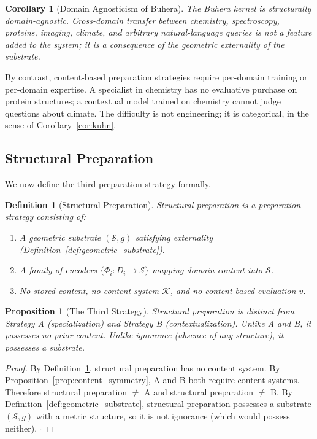 \documentclass[11pt,twocolumn,a4paper]{article}
\newtheorem{corollary}[theorem]{Corollary}
\newtheorem{proposition}[theorem]{Proposition}
\newtheorem{definition}[theorem]{Definition}
\begin{document}
\begin{corollary}[Domain Agnosticism of Buhera]
\label{cor:buhera_agnostic}
The Buhera kernel is structurally domain-agnostic. Cross-domain transfer between chemistry, spectroscopy, proteins, imaging, climate, and arbitrary natural-language queries is not a feature added to the system; it is a consequence of the geometric externality of the substrate.
\end{corollary}

By contrast, content-based preparation strategies require per-domain training or per-domain expertise. A specialist in chemistry has no evaluative purchase on protein structures; a contextual model trained on chemistry cannot judge questions about climate. The difficulty is not engineering; it is categorical, in the sense of Corollary~\ref{cor:kuhn}.

\subsection{Structural Preparation}

We now define the third preparation strategy formally.

\begin{definition}[Structural Preparation]
\label{def:structural_prep}
\emph{Structural preparation} is a preparation strategy consisting of:
\begin{enumerate}
\item A geometric substrate $(\mathcal{S}, g)$ satisfying externality (Definition~\ref{def:geometric_substrate}).
\item A family of encoders $\{\Phi_i : D_i \to \mathcal{S}\}$ mapping domain content into $\mathcal{S}$.
\item No stored content, no content system $\mathcal{K}$, and no content-based evaluation $v$.
\end{enumerate}
\end{definition}

\begin{proposition}[The Third Strategy]
\label{prop:third_strategy}
Structural preparation is distinct from Strategy A (specialization) and Strategy B (contextualization). Unlike A and B, it possesses no prior content. Unlike ignorance (absence of any structure), it possesses a substrate.
\end{proposition}

\begin{proof}
By Definition~\ref{def:structural_prep}, structural preparation has no content system. By Proposition~\ref{prop:content_symmetry}, A and B both require content systems. Therefore structural preparation $\neq$ A and structural preparation $\neq$ B. By Definition~\ref{def:geometric_substrate}, structural preparation possesses a substrate $(\mathcal{S}, g)$ with a metric structure, so it is not ignorance (which would possess neither). $\square$
\end{proof}
\end{document}
